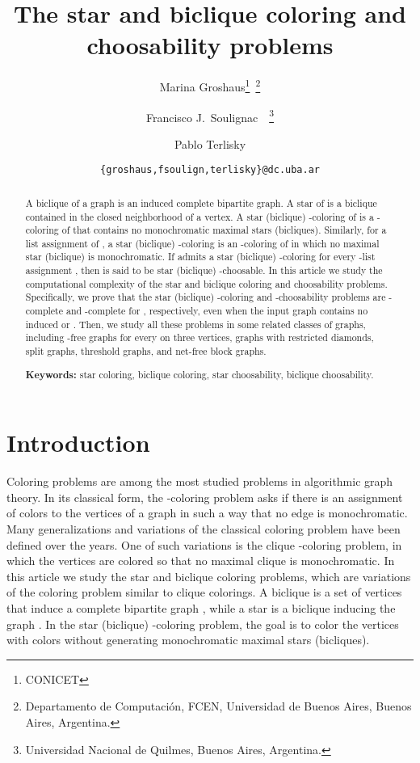 \documentclass[a4paper, 11pt, oneside]{article}
\title{The star and biclique coloring and choosability problems}
\author{Marina Groshaus\thanks{CONICET}~\thanks{Departamento de Computaci\'on, FCEN, Universidad de Buenos Aires, 
Buenos Aires, Argentina.} \and 
  Francisco J.\ Soulignac\footnotemark[1]~\footnotemark[2]~\thanks{Universidad Nacional de Quilmes, Buenos Aires, Argentina.} \and Pablo Terlisky\footnotemark[2]
}
\date{\normalsize\texttt{\{groshaus,fsoulign,terlisky\}@dc.uba.ar}}
\begin{document}
\maketitle
\begin{abstract}
  A biclique of a graph  is an induced complete bipartite graph.  A star of  is a biclique contained in the closed neighborhood of a vertex.  A star (biclique) -coloring of  is a -coloring of  that contains no monochromatic maximal stars (bicliques).  Similarly, for a list assignment  of , a star (biclique) -coloring is an -coloring of  in which no maximal star (biclique) is monochromatic.  If  admits a star (biclique) -coloring for every -list assignment , then  is said to be star (biclique) -choosable.  In this article we study the computational complexity of the star and biclique coloring and choosability problems.  Specifically, we prove that the star (biclique) -coloring and -choosability problems are -complete  and -complete for , respectively, even when the input graph contains no induced  or .   Then, we study all these problems in some related classes of graphs, including -free graphs for every  on three vertices, graphs with restricted diamonds, split graphs, threshold graphs, and net-free block graphs.

 \vspace*{.2\baselineskip} {\bf Keywords:} star coloring, biclique coloring, star choosability, biclique choosability.
\end{abstract}


\section{Introduction}

Coloring problems are among the most studied problems in algorithmic graph theory.  In its classical form, the -coloring problem asks if there is an assignment of  colors to the vertices of a graph in such a way that no edge is monochromatic.  Many generalizations and variations of the classical coloring problem have been defined over the years.  One of such variations is the clique -coloring problem, in which the vertices are colored so that no maximal clique is monochromatic.  In this article we study the star and biclique coloring problems, which are variations of the coloring problem similar to clique colorings.  A biclique is a set of vertices that induce a complete bipartite graph , while a star is a biclique inducing the graph .  In the star (biclique) -coloring problem, the goal is to color the vertices with  colors without generating monochromatic maximal stars (bicliques).
\end{document}

